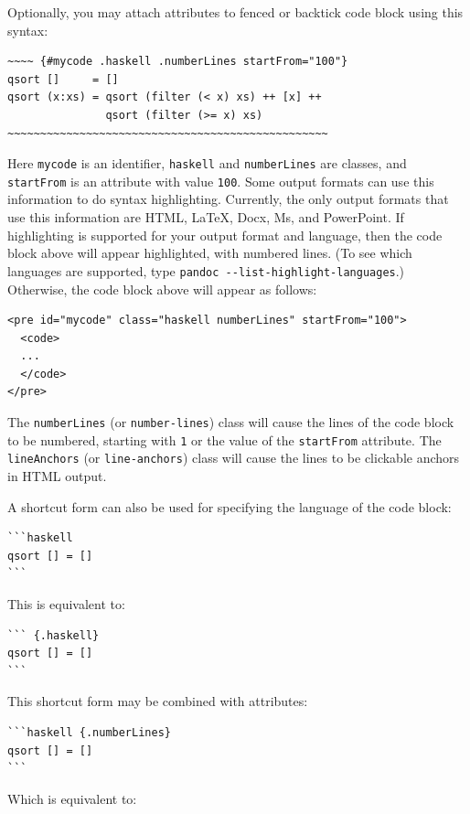 \documentclass[
  b5paper
]{book}
\begin{document}
Optionally, you may attach attributes to fenced or backtick code block
using this syntax:

\begin{verbatim}
~~~~ {#mycode .haskell .numberLines startFrom="100"}
qsort []     = []
qsort (x:xs) = qsort (filter (< x) xs) ++ [x] ++
               qsort (filter (>= x) xs)
~~~~~~~~~~~~~~~~~~~~~~~~~~~~~~~~~~~~~~~~~~~~~~~~~
\end{verbatim}

Here \texttt{mycode} is an identifier, \texttt{haskell} and
\texttt{numberLines} are classes, and \texttt{startFrom} is an attribute
with value \texttt{100}. Some output formats can use this information to
do syntax highlighting. Currently, the only output formats that use this
information are HTML, LaTeX, Docx, Ms, and PowerPoint. If highlighting
is supported for your output format and language, then the code block
above will appear highlighted, with numbered lines. (To see which
languages are supported, type
\texttt{pandoc\ -\/-list-highlight-languages}.) Otherwise, the code
block above will appear as follows:

\begin{verbatim}
<pre id="mycode" class="haskell numberLines" startFrom="100">
  <code>
  ...
  </code>
</pre>
\end{verbatim}

The \texttt{numberLines} (or \texttt{number-lines}) class will cause the
lines of the code block to be numbered, starting with \texttt{1} or the
value of the \texttt{startFrom} attribute. The \texttt{lineAnchors} (or
\texttt{line-anchors}) class will cause the lines to be clickable
anchors in HTML output.

A shortcut form can also be used for specifying the language of the code
block:

\begin{verbatim}
```haskell
qsort [] = []
```
\end{verbatim}

This is equivalent to:

\begin{verbatim}
``` {.haskell}
qsort [] = []
```
\end{verbatim}

This shortcut form may be combined with attributes:

\begin{verbatim}
```haskell {.numberLines}
qsort [] = []
```
\end{verbatim}

Which is equivalent to:
\end{document}
